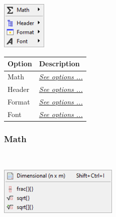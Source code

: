 \hypertarget{menu_insert_latex}{}
\subsection{\Latex}

\includegraphics[scale=0.50]{./res/menu_insert_latex.png}\\

\begin{scriptsize}
  \begin{tabularx}{\textwidth}{>{\hsize=0.3\hsize}X>{\hsize=0.7\hsize}X}\\
    \hline
    \textbf{Option} & \textbf{Description} \\
    \hline
    Math & \textit{\href{\#menu\_insert\_latex\_math}{See options ...}} \\
    Header & \textit{\href{\#menu\_insert\_latex\_header}{See options ...}} \\
    Format & \textit{\href{\#menu\_insert\_latex\_format}{See options ...}} \\
    Font & \textit{\href{\#menu\_insert\_latex\_font}{See options ...}} \\
    \hline
  \end{tabularx}
\end{scriptsize}


\hypertarget{menu_insert_latex_math}{}
\subsubsection{Math}\\

\includegraphics[scale=0.50]{./res/menu_insert_latex_math.png}\\

